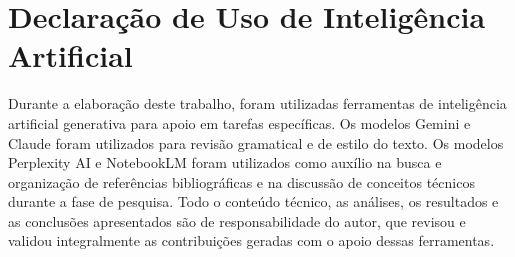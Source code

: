 \cleardoublepage
\chapter*{Declaração de Uso de Inteligência Artificial}

Durante a elaboração deste trabalho, foram utilizadas ferramentas de inteligência artificial generativa para apoio em tarefas específicas. Os modelos Gemini e Claude foram utilizados para revisão gramatical e de estilo do texto. Os modelos Perplexity AI e NotebookLM foram utilizados como auxílio na busca e organização de referências bibliográficas e na discussão de conceitos técnicos durante a fase de pesquisa. Todo o conteúdo técnico, as análises, os resultados e as conclusões apresentados são de responsabilidade do autor, que revisou e validou integralmente as contribuições geradas com o apoio dessas ferramentas.